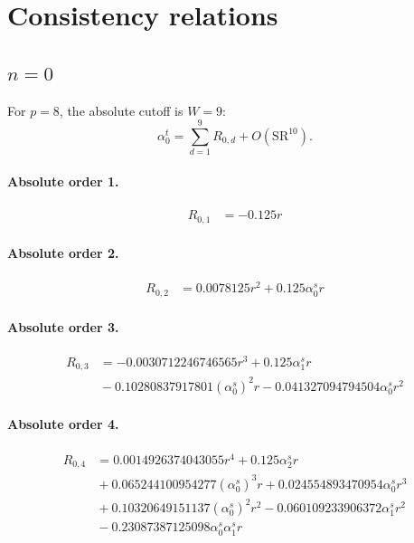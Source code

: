 \documentclass[10pt]{article}
\begin{document}
\section{Consistency relations}
\subsection{$n=0$}
For $p=8$, the absolute cutoff is $W=9$:
\[\alpha_{0}^t=\sum_{d=1}^{9}R_{0,d}+O(\mathrm{SR}^{10}).\]
\paragraph{Absolute order 1.}
\begin{align*}
R_{0,1} &=  - 0.125 r
\end{align*}

\paragraph{Absolute order 2.}
\begin{align*}
R_{0,2} &= 0.0078125 r^{2} + 0.125 \alpha_{0}^s r
\end{align*}

\paragraph{Absolute order 3.}
\begin{align*}
R_{0,3} &=  - 0.0030712246746565 r^{3} + 0.125 \alpha_{1}^s r \\
&{}  - 0.10280837917801 \left(\alpha_{0}^s\right)^{2} r - 0.041327094794504 \alpha_{0}^s r^{2}
\end{align*}

\paragraph{Absolute order 4.}
\begin{align*}
R_{0,4} &= 0.0014926374043055 r^{4} + 0.125 \alpha_{2}^s r \\
&{}  + 0.065244100954277 \left(\alpha_{0}^s\right)^{3} r + 0.024554893470954 \alpha_{0}^s r^{3} \\
&{}  + 0.10320649151137 \left(\alpha_{0}^s\right)^{2} r^{2} - 0.060109233906372 \alpha_{1}^s r^{2} \\
&{}  - 0.23087387125098 \alpha_{0}^s \alpha_{1}^s r
\end{align*}
\end{document}
